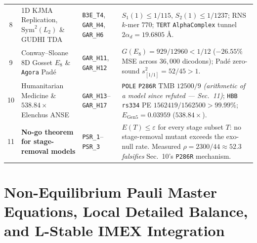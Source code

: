 \documentclass[11pt,a4paper]{article}
\theoremstyle{definition}
\theoremstyle{remark}
\begin{document}
\begin{table}[htbp]
\begin{tabularx}{\textwidth}{@{}c l l X@{}}
8 & 1D KJMA Replication, $\mathrm{Sym}^2(L_2)$ \& GUDHI TDA & \texttt{B3E\_T4}, \texttt{GAR\_H4}, \texttt{GAR\_H6} & $S_1(1) \le 1/115$, $S_2(1) \le 1/1237$; RNS $k$-mer $770$; \texttt{TERT} \texttt{AlphaComplex} tunnel $2\alpha_d = 19.6805\;\text{\AA}$. \\
9 & Conway--Sloane 8D Gosset $E_8$ \& \texttt{Agora} Pad\'e & \texttt{GAR\_H11}, \texttt{GAR\_H12} & $G(E_8) = 929/12960 < 1/12$ ($-26.55\%$ MSE across $36{,}000$ dicodons); Pad\'e zero-sound $s_{[1/1]}^2 = 52/45 > 1$. \\
10 & Humanitarian Medicine \& $538.84\times$ Elenchus ANSE & \texttt{GAR\_H13}--\texttt{GAR\_H17} & \texttt{POLE} \texttt{P286R} TMB $12500/9$ \emph{(arithmetic of a model since refuted --- Sec.~11)}; \texttt{HBB} \texttt{rs334} PE $1562419/1562500 > 99.99\%$; $E_{\mathrm{Gen5}} = 0.03959$ ($538.84\times$). \\
11 & \textbf{No-go theorem for stage-removal models} & \texttt{PSR\_1}--\texttt{PSR\_3} & $E(T) \le \varepsilon$ for every stage subset $T$: no stage-removal mutant exceeds the exo-null rate. Measured $\rho = 2300/44 \approx 52.3$ \emph{falsifies} Sec.~10's \texttt{P286R} mechanism. \\
\bottomrule
\end{tabularx}
\end{table}

\section{Non-Equilibrium Pauli Master Equations, Local Detailed Balance, and L-Stable IMEX Integration}
\end{document}
